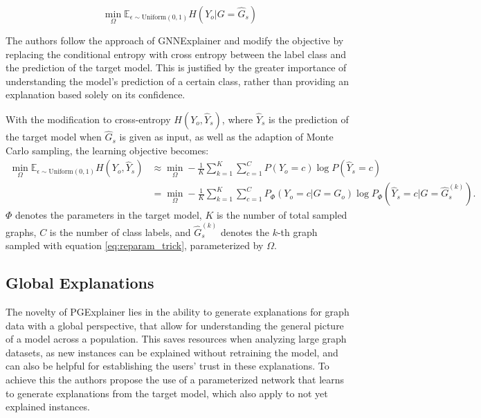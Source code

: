 \begin{equation}
    \min_\Omega \mathbb{E}_{\epsilon \sim \text{Uniform}(0,1)}H(Y_o| G = \hat{G}_s)
\end{equation}

The authors follow the approach of GNNExplainer \cite{ying2019gnnexplainer} and modify the objective by replacing the conditional entropy with cross entropy between the label class and the prediction of the target model. This is justified by the greater importance of understanding the model's prediction of a certain class, rather than providing an explanation based solely on its confidence.

With the modification to cross-entropy $H(Y_o, \hat{Y}_s)$, where $\hat{Y}_s$ is the prediction of the target model when $\hat{G}_s$ is given as input, as well as the adaption of Monte Carlo sampling, the learning objective becomes:
\begin{equation}
    \label{eq:monte_carlo}
    \begin{aligned}
        \min_\Omega\mathbb{E}_{\epsilon\sim\text{Uniform}(0,1)}H(Y_o, \hat{Y}_s) &\approx \min_\Omega -\frac{1}{K}\sum_{k=1}^K\sum_{c=1}^C P(Y_o = c) \log P(\hat{Y}_s = c) \\
        &= \min_\Omega -\frac{1}{K}\sum_{k=1}^K\sum_{c=1}^C P_\Phi (Y_o = c|G = G_o) \log P_\Phi(\hat{Y}_s = c|G=\hat{G}_s^{(k)}).
    \end{aligned}
    \end{equation}
$\Phi$ denotes the parameters in the target model, $K$ is the number of total sampled graphs, $C$ is the number of class labels, and $\hat{G}_s^{(k)}$ denotes the $k$-th graph sampled with equation \ref{eq:reparam_trick}, parameterized by $\Omega$. %





\subsection{Global Explanations}
\label{sec:Global_Explanations}
The novelty of PGExplainer lies in the ability to generate explanations for graph data with a global perspective, that allow for understanding the general picture of a model across a population. This saves resources when analyzing large graph datasets, as new instances can be explained without retraining the model, and can also be helpful for establishing the users' trust in these explanations. To achieve this the authors propose the use of a parameterized network that learns to generate explanations from the target model, which also apply to not yet explained instances. 

